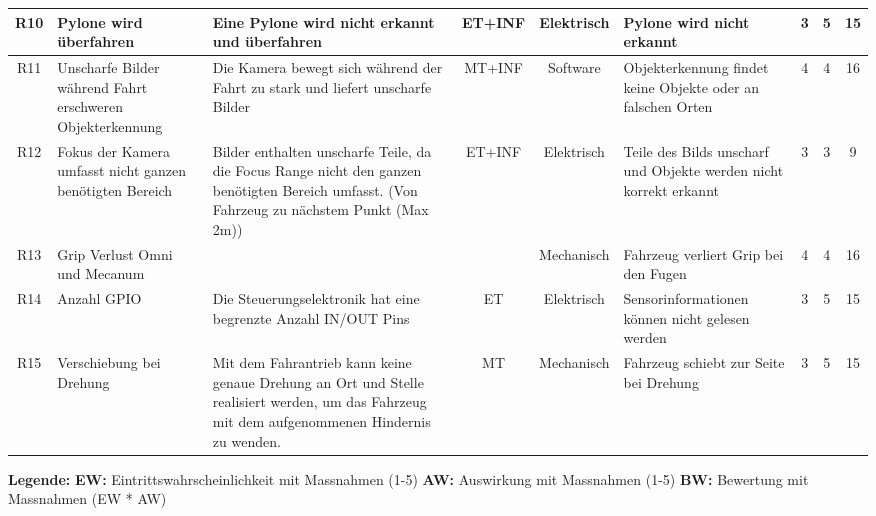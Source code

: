 \documentclass[../main.tex]{subfiles}
\begin{document}
\begin{landscape}
\begin{longtable}{|c|p{4cm}|p{6cm}|c|c|p{4cm}|c|c|c|}
R10 & Pylone wird überfahren & Eine Pylone wird nicht erkannt und überfahren & ET+INF & Elektrisch & Pylone wird nicht erkannt & 3 & 5 & 15 \\ \hline
R11 & Unscharfe Bilder während Fahrt erschweren Objekterkennung & Die Kamera bewegt sich während der Fahrt zu stark und liefert unscharfe Bilder & MT+INF & Software & Objekterkennung findet keine Objekte oder an falschen Orten & 4 & 4 & 16 \\ \hline
R12 & Fokus der Kamera umfasst nicht ganzen benötigten Bereich & Bilder enthalten unscharfe Teile, da die Focus Range nicht den ganzen benötigten Bereich umfasst. (Von Fahrzeug zu nächstem Punkt (Max 2m)) & ET+INF & Elektrisch & Teile des Bilds unscharf und Objekte werden nicht korrekt erkannt & 3 & 3 & 9 \\ \hline
R13 & Grip Verlust Omni und Mecanum & & & Mechanisch & Fahrzeug verliert Grip bei den Fugen & 4 & 4 & 16 \\ \hline
R14 & Anzahl GPIO & Die Steuerungselektronik hat eine begrenzte Anzahl IN/OUT Pins & ET & Elektrisch & Sensorinformationen können nicht gelesen werden & 3 & 5 & 15 \\ \hline
R15 & Verschiebung bei Drehung & Mit dem Fahrantrieb kann keine genaue Drehung an Ort und Stelle realisiert werden, um das Fahrzeug mit dem aufgenommenen Hindernis zu wenden. & MT & Mechanisch & Fahrzeug schiebt zur Seite bei Drehung & 3 & 5 & 15 \\ \hline
\end{longtable}

\newpage

\textbf{Legende:}
\hspace{1cm}
\textbf{EW:} Eintrittswahrscheinlichkeit mit Massnahmen (1-5)
\hspace{1cm}
\textbf{AW:} Auswirkung mit Massnahmen  (1-5)
\hspace{1cm}
\textbf{BW:} Bewertung mit Massnahmen (EW * AW)


\end{landscape}
\end{document}
